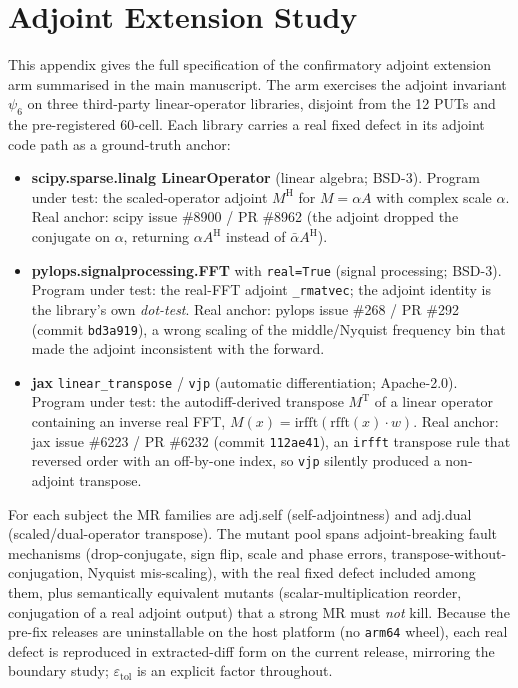 \documentclass[review,12pt,authoryear]{elsarticle}
\providecommand{\tightlist}{\setlength{\itemsep}{0pt}\setlength{\parskip}{0pt}}
\begin{document}
\section{Adjoint Extension Study}\label{h.-adjoint-extension-arm}

This appendix gives the full specification of the confirmatory adjoint
extension arm summarised in the main manuscript. The arm
exercises the adjoint invariant $\psi_6$ on three third-party
linear-operator libraries, disjoint from the 12 PUTs and the
pre-registered 60-cell. Each library carries a real fixed defect in its
adjoint code path as a ground-truth anchor:

\begin{itemize}
\tightlist
\item
  \textbf{scipy.sparse.linalg LinearOperator} (linear algebra; BSD-3).
  Program under test: the scaled-operator adjoint $M^{\mathrm{H}}$ for
  $M = \alpha A$ with complex scale $\alpha$. Real anchor: scipy issue
  \#8900 / PR \#8962 (the adjoint dropped the conjugate on $\alpha$,
  returning $\alpha A^{\mathrm{H}}$ instead of $\bar{\alpha}
  A^{\mathrm{H}}$).
\item
  \textbf{pylops.signalprocessing.FFT} with \texttt{real=True} (signal
  processing; BSD-3). Program under test: the real-FFT adjoint
  \texttt{\_rmatvec}; the adjoint identity is the library's own
  \emph{dot-test}. Real anchor: pylops issue \#268 / PR \#292 (commit
  \texttt{bd3a919}), a wrong scaling of the middle/Nyquist frequency bin
  that made the adjoint inconsistent with the forward.
\item
  \textbf{jax} \texttt{linear\_transpose} / \texttt{vjp} (automatic
  differentiation; Apache-2.0). Program under test: the autodiff-derived
  transpose $M^{\mathrm{T}}$ of a linear operator containing an inverse
  real FFT, $M(x) = \mathrm{irfft}(\mathrm{rfft}(x)\cdot w)$. Real anchor:
  jax issue \#6223 / PR \#6232 (commit \texttt{112ae41}), an
  \texttt{irfft} transpose rule that reversed order with an off-by-one
  index, so \texttt{vjp} silently produced a non-adjoint transpose.
\end{itemize}

For each subject the MR families are adj.self (self-adjointness) and
adj.dual (scaled/dual-operator transpose). The mutant pool spans
adjoint-breaking fault mechanisms (drop-conjugate, sign flip, scale and
phase errors, transpose-without-conjugation, Nyquist mis-scaling), with
the real fixed defect included among them, plus semantically equivalent
mutants (scalar-multiplication reorder, conjugation of a real adjoint
output) that a strong MR must \emph{not} kill. Because the pre-fix
releases are uninstallable on the host platform (no \texttt{arm64} wheel),
each real defect is reproduced in extracted-diff form on the current
release, mirroring the boundary study; $\varepsilon_{\mathrm{tol}}$ is an
explicit factor throughout.
\end{document}

